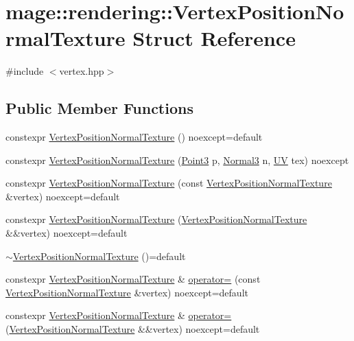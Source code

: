 \hypertarget{structmage_1_1rendering_1_1_vertex_position_normal_texture}{}\section{mage\+:\+:rendering\+:\+:Vertex\+Position\+Normal\+Texture Struct Reference}
\label{structmage_1_1rendering_1_1_vertex_position_normal_texture}


{\ttfamily \#include $<$vertex.\+hpp$>$}

\subsection*{Public Member Functions}
\begin{DoxyCompactItemize}
\item 
constexpr \hyperlink{structmage_1_1rendering_1_1_vertex_position_normal_texture_a9ddc1e28f0e4c893d9dca5fa776d68fe}{Vertex\+Position\+Normal\+Texture} () noexcept=default
\item 
constexpr \hyperlink{structmage_1_1rendering_1_1_vertex_position_normal_texture_a7cb8ef7c0852f680e149dc24d8ae3f12}{Vertex\+Position\+Normal\+Texture} (\hyperlink{structmage_1_1_point3}{Point3} p, \hyperlink{structmage_1_1_normal3}{Normal3} n, \hyperlink{structmage_1_1_u_v}{UV} tex) noexcept
\item 
constexpr \hyperlink{structmage_1_1rendering_1_1_vertex_position_normal_texture_adcff35e1a3653f739b68c10ead5c33da}{Vertex\+Position\+Normal\+Texture} (const \hyperlink{structmage_1_1rendering_1_1_vertex_position_normal_texture}{Vertex\+Position\+Normal\+Texture} \&vertex) noexcept=default
\item 
constexpr \hyperlink{structmage_1_1rendering_1_1_vertex_position_normal_texture_a93576bdd7233682f8758a187a6958428}{Vertex\+Position\+Normal\+Texture} (\hyperlink{structmage_1_1rendering_1_1_vertex_position_normal_texture}{Vertex\+Position\+Normal\+Texture} \&\&vertex) noexcept=default
\item 
\hyperlink{structmage_1_1rendering_1_1_vertex_position_normal_texture_ad776aa49c8bb1ec6bb0468eacd85feac}{$\sim$\+Vertex\+Position\+Normal\+Texture} ()=default
\item 
constexpr \hyperlink{structmage_1_1rendering_1_1_vertex_position_normal_texture}{Vertex\+Position\+Normal\+Texture} \& \hyperlink{structmage_1_1rendering_1_1_vertex_position_normal_texture_ab41cec4ed6c1a38cd4bc5c73e78ec747}{operator=} (const \hyperlink{structmage_1_1rendering_1_1_vertex_position_normal_texture}{Vertex\+Position\+Normal\+Texture} \&vertex) noexcept=default
\item 
constexpr \hyperlink{structmage_1_1rendering_1_1_vertex_position_normal_texture}{Vertex\+Position\+Normal\+Texture} \& \hyperlink{structmage_1_1rendering_1_1_vertex_position_normal_texture_a16913ccdaec3d1a0a67b4ba33cc7b7d1}{operator=} (\hyperlink{structmage_1_1rendering_1_1_vertex_position_normal_texture}{Vertex\+Position\+Normal\+Texture} \&\&vertex) noexcept=default
\end{DoxyCompactItemize}
